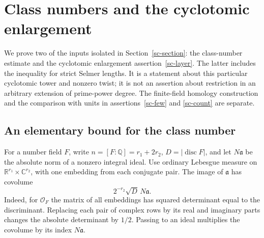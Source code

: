 \section{Class numbers and the cyclotomic enlargement}
\label{sl-section}

We prove two of the inputs isolated in Section~\ref{sc-section}:
the class-number estimate and the cyclotomic enlargement
assertion~\ref{sc-layer}.  The latter includes the inequality for
strict Selmer lengths.  It is a statement about this particular
cyclotomic tower and nonzero twist; it is not an assertion about
restriction in an arbitrary extension of prime-power degree.
The finite-field homology construction and the comparison with
units in assertions~\ref{sc-few} and \ref{sc-count} are separate.

\subsection{An elementary bound for the class number}

For a number field $F$, write $n=[F:\mathbb Q]=r_1+2r_2$,
$D=|\operatorname{disc}F|$, and let $N\mathfrak a$ be the
absolute norm of a nonzero integral ideal.  Use ordinary Lebesgue
measure on $\mathbb R^{r_1}\times\mathbb C^{r_2}$, with one
embedding from each conjugate pair.  The image of $\mathfrak a$
has covolume
\[
                 2^{-r_2}\sqrt D\,N\mathfrak a .
                 \tag{SL1}
\]
Indeed, for $\mathcal O_F$ the matrix of all embeddings has
squared determinant equal to the discriminant.  Replacing each
pair of complex rows by its real and imaginary parts changes
the absolute determinant by $1/2$.  Passing to an ideal
multiplies the covolume by its index $N\mathfrak a$.

